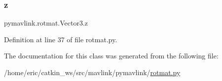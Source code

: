 \subsubsection{\texorpdfstring{z}{z}}
{\footnotesize\ttfamily pymavlink.\+rotmat.\+Vector3.\+z}



Definition at line 37 of file rotmat.\+py.



The documentation for this class was generated from the following file\+:\begin{DoxyCompactItemize}
\item 
/home/eric/catkin\+\_\+ws/src/mavlink/pymavlink/\mbox{\hyperlink{rotmat_8py}{rotmat.\+py}}\end{DoxyCompactItemize}
